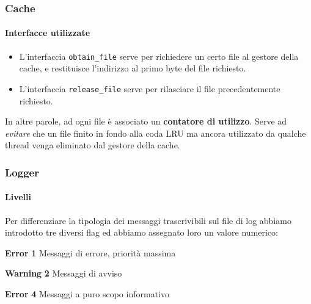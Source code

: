 \documentclass{beamer}
\begin{document}
\begin{frame}[fragile]
\frametitle{Cache}
\framesubtitle{Interfacce utilizzate}

\begin{itemize}


\item L'interfaccia \texttt{obtain\_file} serve per richiedere un certo file al gestore della cache, e
restituisce l'indirizzo al primo byte del file richiesto.

\item L'interfaccia \texttt{release\_file} serve per rilasciare il file precedentemente richiesto.
\end{itemize}

In altre parole, ad ogni file è associato un \textbf{contatore di utilizzo}. Serve ad \textit{evitare} che un file finito in fondo alla coda LRU ma ancora utilizzato da qualche thread venga eliminato dal gestore della cache.


\end{frame}

\begin{frame}
\frametitle{Logger}
\framesubtitle{Livelli}

Per differenziare la tipologia dei messaggi trascrivibili sul file di log abbiamo
introdotto tre diversi flag ed abbiamo assegnato loro un valore numerico:

\medskip
\medskip

\textbf{Error} \hspace{1.2cm} \textbf{1} \hspace{1cm} Messaggi di errore, priorità massima

\medskip

\textbf{Warning} \hspace{0.64cm} \textbf{2} \hspace{1cm} Messaggi di avviso

\medskip

\textbf{Error} \hspace{1.2cm} \textbf{4} \hspace{1cm} Messaggi a puro scopo informativo

\medskip
\medskip
\medskip


\end{frame}
\end{document}
